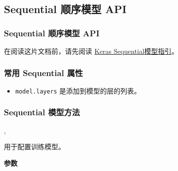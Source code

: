 \subsection{Sequential 顺序模型 API}\label{sequential-api}

\subsubsection{Sequential 顺序模型 API}
在阅读这片文档前，请先阅读
\hyperref[sequential-model-guide]{Keras Sequential模型指引}。

\subsubsection{常用 Sequential 属性}\label{ux5e38ux7528-sequential-ux5c5eux6027}

\begin{itemize}
\tightlist
\item
  \texttt{model.layers} 是添加到模型的层的列表。
\end{itemize}



\subsubsection{Sequential 模型方法}\label{sequential-ux6a21ux578bux65b9ux6cd5}

\label{compile}

\begin{Shaded}
\begin{Highlighting}[]
\NormalTok{(}\OperatorTok{=}\OperatorTok{=}, \\
\hspace{1.4cm} \OperatorTok{=}\OperatorTok{=}\NormalTok{)}
\end{Highlighting}
\end{Shaded}

用于配置训练模型。

\textbf{参数}

